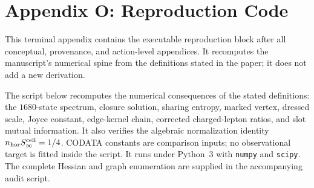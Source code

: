 \documentclass[11pt]{article}
\begin{document}
\section*{Appendix O: Reproduction Code}

This terminal appendix contains the executable reproduction block after all conceptual, provenance, and action-level appendices. It recomputes the manuscript's numerical spine from the definitions stated in the paper; it does not add a new derivation.

The script below recomputes the numerical consequences of the stated definitions: the $1680$-state spectrum, closure solution, sharing entropy, marked vertex, dressed scale, Joyce constant, edge-kernel chain, corrected charged-lepton ratios, and slot mutual information. It also verifies the algebraic normalization identity $n_{\rm hor}S_\infty^{\rm cell}=1/4$. CODATA constants are comparison inputs; no observational target is fitted inside the script. It runs under Python~3 with \texttt{numpy} and \texttt{scipy}. The complete Hessian and graph enumeration are supplied in the accompanying audit script.
\end{document}

